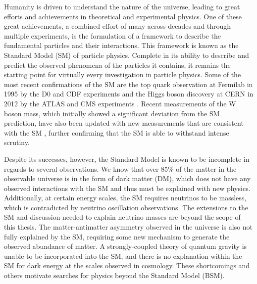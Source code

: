 Humanity is driven to understand the nature of the universe, leading to great efforts and achievements in theoretical and experimental physics.
One of these great achievements, a combined effort of many across decades and through multiple experiments, is the formulation of a framework to describe the fundamental particles and their interactions.
This framework is known as the Standard Model (SM) of particle physics.
Complete in its ability to describe and predict the observed phenomena of the particles it contains, it remains the starting point for virtually every investigation in particle physics.
Some of the most recent confirmations of the SM are the top quark observation at Fermilab in 1995 by the D0 and CDF experiments \cite{PhysRevLett.74.2626,PhysRevLett.74.2632} and the Higgs boson discovery at CERN in 2012 by the ATLAS and CMS experiments \cite{HIGG-2012-27,CMS-HIG-12-028}.
Recent measurements of the W boson mass, which initially showed a significant deviation from the SM prediction, have also been updated with new measurements that are consistent with the SM \cite{science.abk1781,atlas_2024}, further confirming that the SM is able to withstand intense scrutiny.


Despite its successes, however, the Standard Model is known to be incomplete in regards to several observations.
We know that over 85\% of the matter in the observable universe is in the form of dark matter (DM), which does not have any observed interactions with the SM and thus must be explained with new physics.
Additionally, at certain energy scales, the SM requires neutrinos to be massless, which is contradicted by neutrino oscillation observations.
The extensions to the SM and discussion needed to explain neutrino masses are beyond the scope of this thesis.
The matter-antimatter asymmetry observed in the universe is also not fully explained by the SM, requiring some new mechanism to generate the observed abundance of matter.
A strongly-coupled theory of quantum gravity is unable to be incorporated into the SM, and there is no explanation within the SM for dark energy at the scales observed in cosmology.
These shortcomings and others motivate searches for physics beyond the Standard Model (BSM).

